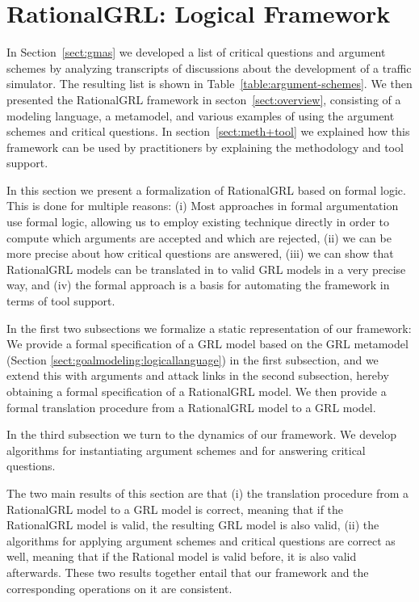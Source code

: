 \section{RationalGRL: Logical Framework}
\label{sect:formalframework}

In Section~\ref{sect:gmas} we developed a list of critical questions and argument schemes by analyzing transcripts of discussions about the development of a traffic simulator. The resulting list is shown in Table~\ref{table:argument-schemes}. We then presented the RationalGRL framework in secton~\ref{sect:overview}, consisting of a modeling language, a metamodel, and various examples of using the argument schemes and critical questions. In section~\ref{sect:meth+tool} we explained how this framework can be used by practitioners by explaining the methodology and tool support.

In this section we present a formalization of RationalGRL based on formal logic. This is done for multiple reasons: (i) Most approaches in formal argumentation use formal logic, allowing us to employ existing technique directly in order to compute which arguments are accepted and which are rejected, (ii) we can be more precise about how critical questions are answered, (iii) we can show that RationalGRL models can be translated in to valid GRL models in a very precise way, and (iv) the formal approach is a basis for automating the framework in terms of tool support.

In the first two subsections we formalize a static representation of our framework: We provide a formal specification of a GRL model based on the GRL metamodel (Section \ref{sect:goalmodeling:logicallanguage}) in the first subsection, and we extend this with arguments and attack links in the second subsection, hereby obtaining a formal specification of a RationalGRL model. We then provide a formal translation procedure from a RationalGRL model to a GRL model.

In the third subsection we turn to the dynamics of our framework. We develop algorithms for instantiating argument schemes and for answering critical questions.

The two main results of this section are that (i) the translation procedure from a RationalGRL model to a GRL model is correct, meaning that if the RationalGRL model is valid, the resulting GRL model is also valid, (ii) the algorithms for applying argument schemes and critical questions are correct as well, meaning that if the Rational model is valid before, it is also valid afterwards. These two results together entail that our framework and the corresponding operations on it are consistent.

